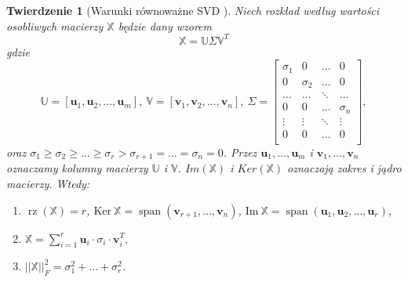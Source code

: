 \documentclass[12pt,a4paper]{report}
\newtheorem{tw}[df]{Twierdzenie}
\newcommand{\przestrzen}[1]{\operatorname{span}\left({#1} \right)}
\newcommand{\rz}[1]{\operatorname{rz}\left({#1} \right)}
\begin{document}
\begin{tw}[Warunki równoważne SVD {\citep{ulafiir}}]%
Niech rozkład według wartości osobliwych macierzy $\mathbb{X}$ będzie dany wzorem
$$
\mathbb{X}=\mathbb{U} \Sigma \mathbb{V}^T
$$
gdzie 
$$\mathbb{U}=[\mathbf{u}_1,\mathbf{u}_2,...,\mathbf{u}_m], \: \mathbb{V} = [\mathbf{v}_1,\mathbf{v}_2,...,\mathbf{v}_n], \: \Sigma = \left[
        \begin{array}{cccc}
         \sigma_{1} & 0 & \ldots & 0 \\
         0 & \sigma_{2} & \ldots & 0 \\
         \ldots & \ldots& \ddots & \ldots \\
         0 & 0 & \ldots & \sigma_{n} \\
         \vdots & \vdots & \ddots & \vdots \\
         0 & 0 & \ldots & 0 \\
         \end{array}
      \right],$$
oraz 
$\sigma_{1}\geq \sigma_{2} \geq ... \geq \sigma_{r} > \sigma_{r+1} = ... = \sigma_{n} = 0$. Przez $\mathbf{u}_1, \ldots, \mathbf{u}_m$ i $\mathbf{v}_1, \ldots, \mathbf{v}_n$ oznaczamy kolumny macierzy $\mathbb{U}$ i $\mathbb{V}$.
$Im(\mathbb{X})$ i $Ker(\mathbb{X})$ oznaczają zakres i jądro macierzy.
Wtedy:
\begin{enumerate}
\item $\rz{\mathbb{X}} = r$, $\mathrm{Ker} \: \mathbb{X} = \przestrzen{\mathbf{v}_{r+1},...,\mathbf{v}_n}$, 
$\mathrm{Im} \: \mathbb{X} = \przestrzen{\mathbf{u}_1,\mathbf{u}_2,...,\mathbf{u}_r}$,
\item $\mathbb{X} = \sum_{i=1}^r \mathbf{u}_i \cdot\sigma_i \cdot \mathbf{v}_i^T,$
\item $||\mathbb{X}||_F^2 = \sigma_{1}^2+...+\sigma_{r}^2$.
\end{enumerate}
\end{tw}
\end{document}
